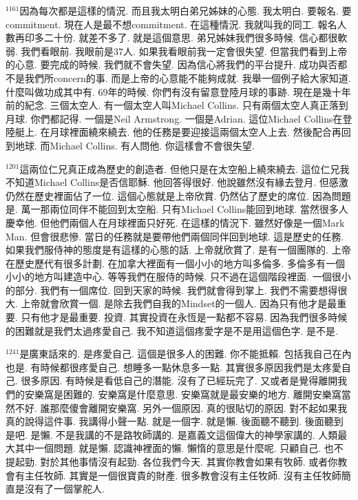 \documentclass{book}
\begin{document}
$^{1161}$因為每次都是這樣的情況.
而且我太明白弟兄姊妹的心態.
我太明白.
要報名.
要commitment.
現在人是最不想commitment.
在這種情況.
我就叫我的同工.
報名人數再印多二十份.
就差不多了.
就是這個意思.
弟兄姊妹我們很多時候.
信心都很軟弱.
我們看眼前.
我眼前是37人.
如果我看眼前我一定會很失望.
但當我們看到上帝的心意.
要完成的時候.
我們就不會失望.
因為信心將我們的平台提升.
成功與否都不是我們所concern的事.
而是上帝的心意能不能夠成就.
我舉一個例子給大家知道.
什麼叫做功成其中有.
69年的時候.
你們有沒有留意登陸月球的事跡.
現在是幾十年前的紀念.
三個太空人.
有一個太空人叫Michael Collins.
只有兩個太空人真正落到月球.
你們都記得.
一個是Neil Armstrong.
一個是Adrian.
這位Michael Collins在登陸艇上.
在月球裡面繞來繞去.
他的任務是要迎接這兩個太空人上去.
然後配合再回到地球.
而Michael Collins.
有人問他.
你這樣會不會很失望.

$^{1201}$這兩位仁兄真正成為歷史的創造者.
但他只是在太空船上繞來繞去.
這位仁兄我不知道Michael Collins是否信耶穌.
他回答得很好.
他說雖然沒有緣去登月.
但感激仍然在歷史裡面佔了一位.
這個心態就是上帝欣賞.
仍然佔了歷史的席位.
因為問題是.
萬一那兩位同伴不能回到太空船.
只有Michael Collins能回到地球.
當然很多人慶幸他.
但他們兩個人在月球裡面只好死.
在這樣的情況下.
雖然好像是一個Mark Man.
但會很悲慘.
當日的任務就是要帶他們兩個同伴回到地球.
這是歷史的任務.
如果我們服侍神的態度是有這樣的心態的話.
上帝就欣賞了.
是有一個團隊的.
上帝在歷史歷代有很多計劃.
在加拿大裡面有一個小小的地方叫多倫多.
多倫多有一個小小的地方叫建造中心.
等等我們在服侍的時候.
只不過在這個階段裡面.
一個很小的部分.
我們有一個席位.
回到天家的時候.
我們就會得到掌上.
我們不需要想得很大.
上帝就會欣賞一個.
是除去我們自我的Mindset的一個人.
因為只有他才是最重要.
只有他才是最重要.
投資.
其實投資在永恆是一點都不容易.
因為我們很多時候的困難就是我們太過疼愛自己.
我不知道這個疼愛字是不是用這個色字.
是不是.

$^{1241}$是廣東話來的.
是疼愛自己.
這個是很多人的困難.
你不能抵賴.
包括我自己在內也是.
有時候都很疼愛自己.
想睡多一點休息多一點.
其實很多原因我們是太疼愛自己.
很多原因.
有時候是看低自己的潛能.
沒有了已經玩完了.
又或者是覺得離開我們的安樂窩是困難的.
安樂窩是什麼意思.
安樂窩就是最安樂的地方.
離開安樂窩當然不好.
誰那麼傻會離開安樂窩.
另外一個原因.
真的很貼切的原因.
對不起如果我真的說得這件事.
我講得小聲一點.
就是一個字.
就是懶.
後面聽不聽到.
後面聽到是吧.
是懶.
不是我講的不是路牧師講的.
是嘉義文這個偉大的神學家講的.
人類最大其中一個問題.
就是懶.
認識神裡面的懶.
懶惰的意思是什麼呢.
只顧自己.
也不提起勁.
對於其他事情沒有起勁.
各位我們今天.
其實你教會如果有牧師.
或者你教會有主任牧師.
其實是一個很寶貴的財產.
很多教會沒有主任牧師.
沒有主任牧師簡直是沒有了一個掌舵人.
\end{document}
